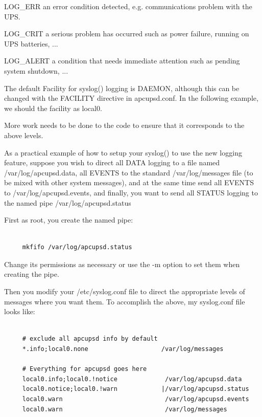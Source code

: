 LOG\_ERR an error condition detected, e.g. communications problem with the
UPS.  

LOG\_CRIT a serious problem has occurred such as power failure, running on UPS
batteries, ...  

LOG\_ALERT a condition that needs immediate attention such as pending system
shutdown, ...  

The default Facility for syslog() logging is DAEMON, although this can be
changed with the FACILITY directive in apcupsd.conf. In the following example,
we should the facility as local0.  

More work needs to be done to the code to ensure that it corresponds to the
above levels.  

As a practical example of how to setup your syslog() to use the new logging
feature, suppose you wish to direct all DATA logging to a file named
/var/log/apcupsd.data, all EVENTS to the standard /var/log/messages file (to
be mixed with other system messages), and at the same time send all EVENTS to
/var/log/apcupsd.events, and finally, you want to send all STATUS logging to
the named pipe /var/log/apcupsd.status  

First as root, you create the named pipe: 

\footnotesize
\begin{verbatim}
     
     mkfifo /var/log/apcupsd.status
\end{verbatim}
\normalsize

Change its permissions as necessary or use the -m option to set them when
creating the pipe.  

Then you modify your /etc/syslog.conf file to direct the appropriate levels of
messages where you want them. To accomplish the above, my syslog.conf file
looks like: 

\footnotesize
\begin{verbatim}
     
     # exclude all apcupsd info by default
     *.info;local0.none                    /var/log/messages
     
     # Everything for apcupsd goes here
     local0.info;local0.!notice             /var/log/apcupsd.data
     local0.notice;local0.!warn            |/var/log/apcupsd.status
     local0.warn                            /var/log/apcupsd.events
     local0.warn                            /var/log/messages
\end{verbatim}
\normalsize

\label{Developers-Notes}

